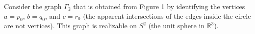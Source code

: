 Consider the graph $\Gamma_2$ that is obtained from Figure 1 by identifying the vertices $a = p_0$, $b = q_0$, and $c = r_0$ (the apparent intersections of the edges inside the circle are not vertices). This graph is realizable on $S^2$ (the unit sphere in $\mathbb{R}^3$).
